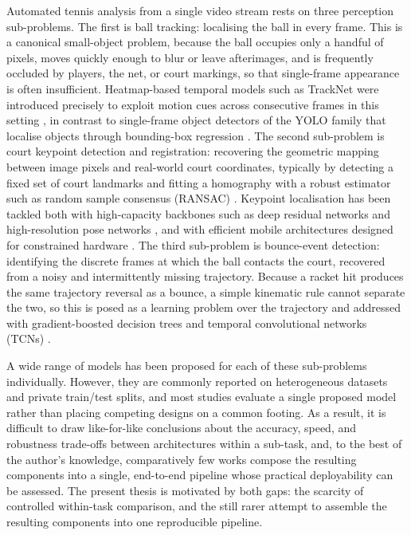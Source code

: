 Automated tennis analysis from a single video stream rests on three perception
sub-problems. The first is ball tracking: localising the ball in every
frame. This is a canonical small-object problem, because the ball occupies only
a handful of pixels, moves quickly enough to blur or leave afterimages, and is
frequently occluded by players, the net, or court markings, so that
single-frame appearance is often insufficient. Heatmap-based temporal models
such as TrackNet were introduced precisely to exploit motion cues across
consecutive frames in this setting \cite{huang2019tracknet}, in contrast to
single-frame object detectors of the YOLO family that localise objects through
bounding-box regression \cite{redmon2016yolo}. The second sub-problem is
court keypoint detection and registration: recovering the geometric
mapping between image pixels and real-world court coordinates, typically by
detecting a fixed set of court landmarks and fitting a homography with a robust
estimator such as random sample consensus (RANSAC) \cite{fischler1981ransac}.
Keypoint localisation has been tackled both with high-capacity backbones such
as deep residual networks \cite{he2016resnet} and high-resolution pose networks
\cite{sun2019hrnet}, and with efficient mobile architectures designed for
constrained hardware \cite{howard2019mobilenetv3}. The third sub-problem is
bounce-event detection: identifying the discrete frames at which the ball
contacts the court, recovered from a noisy and intermittently missing
trajectory. Because a racket hit produces the same trajectory reversal as a
bounce, a simple kinematic rule cannot separate the two, so this is posed as a
learning problem over the trajectory and addressed with gradient-boosted decision
trees \cite{chen2016xgboost} and temporal convolutional networks (TCNs)
\cite{bai2018tcn}.

A wide range of models has been proposed for each of these sub-problems
individually. However, they are commonly reported on heterogeneous datasets and
private train/test splits, and most studies evaluate a single proposed model
rather than placing competing designs on a common footing. As a result, it is
difficult to draw like-for-like conclusions about the accuracy, speed, and
robustness trade-offs between architectures within a sub-task, and, to
the best of the author's knowledge, comparatively few works compose the
resulting components into a single, end-to-end pipeline whose practical
deployability can be assessed. The present thesis is motivated by both gaps: the scarcity of controlled
within-task comparison, and the still rarer attempt to assemble the resulting
components into one reproducible pipeline.


